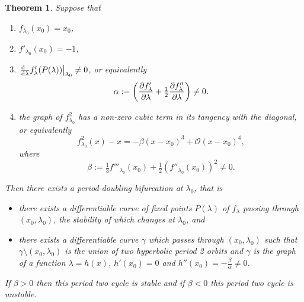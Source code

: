 \documentclass{notes}
\newcommand{\cO}{\mathcal{O}}
\theoremstyle{plain}
\newtheorem{theorem}[proposition]{Theorem}
\begin{document}
\begin{theorem}
Suppose that
\begin{enumerate}
\item $f_{\lambda_0}(x_0) = x_0$,
\item $f'_{\lambda_0}(x_0) = -1$,
\item $\left. \frac{\mathrm{d}\phantom{\lambda}}{\mathrm{d}\lambda} f'_\lambda(P(\lambda))
\right|_{\lambda_0} \neq 0$, or equivalently
\[
\alpha := \left( \frac{\partial f'_\lambda}{\partial \lambda} + \tfrac{1}{2}
\frac{\partial f_\lambda''}{\partial \lambda}\right) \neq 0.
\]
\item the graph of $f^2_{\lambda_0}$ has a non-zero cubic
term in its tangency with the diagonal, or equivalently
\[
f^2_{\lambda_0}(x) - x = - \beta (x-x_0)^3 + \cO(x-x_0)^4,
\]
where
\[
\beta := \tfrac{1}{3} f'''_{\lambda_0}(x_0)
+ \tfrac{1}{2} \left( f''_{\lambda_0}(x_0)\right)^2 \neq 0.
\]
\end{enumerate}

Then there exists a period-doubling bifurcation at $\lambda_0$, that is

\begin{itemize}
\item there exists a differentiable curve of fixed points $P(\lambda)$
of $f_\lambda$ passing through $(x_0,\lambda_0)$, the stability of
which changes at $\lambda_0$, and
\item there exists a differentiable curve $\gamma$
which passes through $(x_0,\lambda_0)$ such that
$\gamma \setminus (x_0,\lambda_0)$ is the union of two hyperbolic
period 2 orbits and $\gamma$ is the graph of a function
$\lambda = h(x)$, $h'(x_0) = 0$ and $h''(x_0) = - \tfrac{\beta}{\alpha}
\neq 0$.
\end{itemize}

If $\beta > 0$ then this period two cycle is stable and if
$\beta < 0$ this period two cycle is unstable.
\end{theorem}
\end{document}
